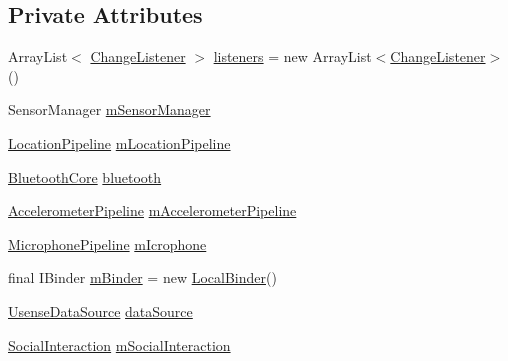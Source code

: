 \subsection*{Private Attributes}
\begin{DoxyCompactItemize}
\item 
Array\+List$<$ \hyperlink{interfacecs_1_1usense_1_1_change_listener}{Change\+Listener} $>$ \hyperlink{classcs_1_1usense_1_1_usense_service_a71cb28de66ce79c32cc7bb9cf8299c1a}{listeners} = new Array\+List$<$\hyperlink{interfacecs_1_1usense_1_1_change_listener}{Change\+Listener}$>$ ()
\item 
Sensor\+Manager \hyperlink{classcs_1_1usense_1_1_usense_service_ab93d0af2a257379caa8406afd31f070e}{m\+Sensor\+Manager}
\item 
\hyperlink{classcs_1_1usense_1_1location_1_1_location_pipeline}{Location\+Pipeline} \hyperlink{classcs_1_1usense_1_1_usense_service_a9233b9b84371bc77c397123c28f54f32}{m\+Location\+Pipeline}
\item 
\hyperlink{classcs_1_1usense_1_1bluetooth_1_1_bluetooth_core}{Bluetooth\+Core} \hyperlink{classcs_1_1usense_1_1_usense_service_ac1def6b6926720ac65169b1c45bcca02}{bluetooth}
\item 
\hyperlink{classcs_1_1usense_1_1accelerometer_1_1_accelerometer_pipeline}{Accelerometer\+Pipeline} \hyperlink{classcs_1_1usense_1_1_usense_service_a8a34b51ec2f7731dee62e886cd50dffe}{m\+Accelerometer\+Pipeline}
\item 
\hyperlink{classcs_1_1usense_1_1microphone_1_1_microphone_pipeline}{Microphone\+Pipeline} \hyperlink{classcs_1_1usense_1_1_usense_service_a7f6a621051f5527dc7a126f0c8115483}{m\+Icrophone}
\item 
final I\+Binder \hyperlink{classcs_1_1usense_1_1_usense_service_abfd01552fe63f68304a96a1022f1b550}{m\+Binder} = new \hyperlink{classcs_1_1usense_1_1_usense_service_1_1_local_binder}{Local\+Binder}()
\item 
\hyperlink{classcs_1_1usense_1_1db_1_1_usense_data_source}{Usense\+Data\+Source} \hyperlink{classcs_1_1usense_1_1_usense_service_a9474e65ad523c9db7405f7216bd89e7a}{data\+Source}
\item 
\hyperlink{classcs_1_1usense_1_1inference_module_1_1_social_interaction}{Social\+Interaction} \hyperlink{classcs_1_1usense_1_1_usense_service_a5f5920a5da11e00ac573b18f3be7c351}{m\+Social\+Interaction}
\end{DoxyCompactItemize}
